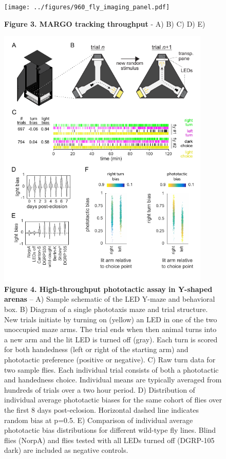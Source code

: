 \documentclass[10pt]{article}
\begin{document}
\newpage
\begin{figure}[h!]
	\begin{center}
		\texttt{[image: ../figures/960\_fly\_imaging\_panel.pdf]}
	\end{center}
	\caption*{\footnotesize \textbf{Figure 3. MARGO tracking throughput} - A) B) C) D) E)}
\end{figure}

\newpage
\begin{figure}[h!]
	\begin{center}
		\includegraphics[width=0.9\textwidth]{../figures/LED_ymaze_panel.pdf}
	\end{center}
	\caption*{\footnotesize \textbf{Figure 4. High-throughput phototactic assay in Y-shaped arenas} -- A) Sample schematic of the LED Y-maze and behavioral box. B) Diagram of a single phototaxis maze and trial structure. New trials initiate by turning on (yellow) an LED in one of the two unoccupied maze arms. The trial ends when then animal turns into a new arm and the lit LED is turned off (gray). Each turn is scored for both handedness (left or right of the starting arm) and phototactic preference (positive or negative). C) Raw turn data for two sample flies. Each individual trial consists of both a phototactic and handedness choice. Individual means are typically averaged from hundreds of trials over a two hour period. D) Distribution of individual average phototactic biases for the same cohort of flies over the first 8 days post-eclosion. Horizontal dashed line indicates random bias at p=0.5. E) Comparison of individual average phototactic bias distributions for different wild-type fly lines. Blind flies (NorpA) and flies tested with all LEDs turned off (DGRP-105 dark) are included as negative controls.}
\end{figure}
\end{document}
